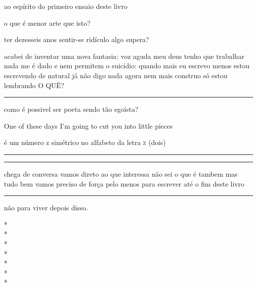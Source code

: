 \begin{poem}
\begin{stanza}
ao espírito \verseline
do primeiro ensaio\verseline
deste livro
\end{stanza}
\begin{stanza}
o que é menor arte\verseline
que isto?
\end{stanza}
\begin{stanza}
ter dezesseis anos\verseline
sentir-se ridículo\verseline
algo supera?
\end{stanza}
\begin{stanza}
acabei de inventar\verseline
uma nova fantasia:\verseline
voz aguda\verseline
meu deus\verseline
tenho que trabalhar\verseline
nada me é dado\verseline
e nem permitem\verseline
o suicídio:\verseline
\qquad quando mais eu escrevo\verseline
\qquad menos estou escrevendo\verseline
de natural já não digo nada\verseline
agora nem mais construo\verseline
\quad só estou lembrando\verseline
\qquad \qquad \qquad \qquad O QUÊ?\verseline
\rule{4cm}{0.4pt} como é\verseline
possivel ser poeta\verseline
sendo tão egoísta? \underline{ } \underline{ } \underline{ } \underline{ } \underline{ } \underline{ } \underline{ }
\end{stanza}
\clearpage
{}
\begin{stanza}
One of these days\verseline
I’m going to cut you\verseline
into little pieces
\end{stanza}
\begin{stanza}
é um número z\verseline
simétrico\verseline
no alfabeto\verseline
da letra \textsc{z} (dois) \rule{4.25cm}{0.4pt}\verseline
\rule{4cm}{0.4pt} chega de conversa\verseline
vamos direto\verseline
ao que interessa\verseline
não sei o que é tambem\verseline
mas tudo bem\verseline
vamos\verseline
preciso de força\verseline
pelo menos\verseline
para escrever até o fim deste livro\verseline
\rule{2cm}{0.4pt} não para viver depois disso.
\end{stanza}
\end{poem}

\begin{center}
*\\
*\\
*\\
*\\
*\\
*\\
*
\end{center}